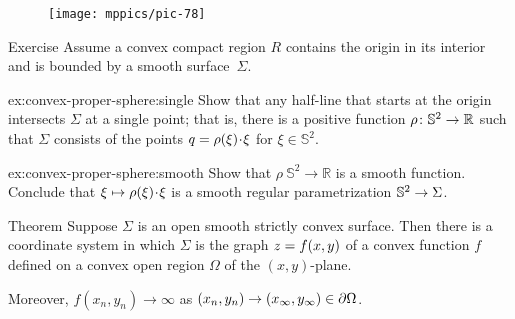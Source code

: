 {

\begin{wrapfigure}[8]{r}{33 mm}
\vskip-4mm
\centering
\texttt{[image: mppics/pic-78]}
\end{wrapfigure}

\begin{thm}{Exercise}\label{ex:convex-proper-sphere}
Assume a convex compact region $R$ contains the origin in its interior and is bounded by a smooth surface~$\Sigma$.

\begin{subthm}{ex:convex-proper-sphere:single}
Show that any half-line that starts at the origin intersects $\Sigma$ at a single point;
that is, there is a positive function $\rho\:\mathbb{S}^2\z\to\mathbb{R}$ such that $\Sigma$ consists of the points $q\z=\rho(\xi)\cdot \xi$ for $\xi\in \mathbb{S}^2$.
\end{subthm}

\begin{subthm}{ex:convex-proper-sphere:smooth}
Show that $\rho\:\mathbb{S}^2\to\mathbb{R}$ is a smooth function.
Conclude that $\xi\z\mapsto \rho(\xi)\cdot \xi$ is a smooth regular parametrization $\mathbb{S}^2\z\to \Sigma$.
\end{subthm}

\end{thm}

}

\begin{thm}{Theorem}\label{thm:convex-open}
Suppose $\Sigma$ is an open smooth strictly convex surface.
Then there is a coordinate system in which $\Sigma$ is the graph $z\z=f(x,y)$ of a convex function $f$ defined on a convex open region $\Omega$ of the $(x,y)$-plane.

Moreover, $f(x_n,y_n)\to\infty$ as $(x_n,y_n)\to(x_\infty,y_\infty)\z\in \partial\Omega$.

\end{thm}

